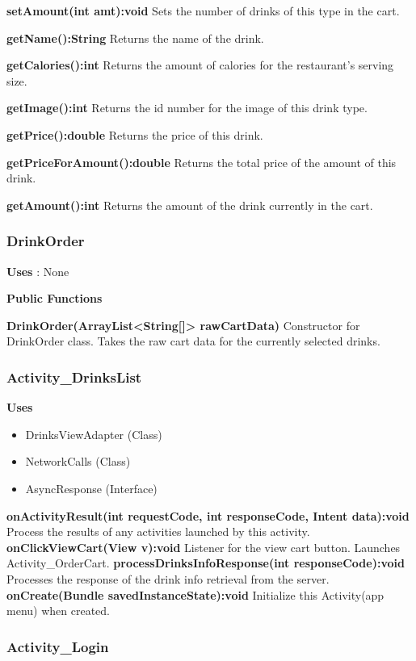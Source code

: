 \documentclass [10pt]{article}
\begin{document}
\textbf{setAmount(int amt):void}
Sets the number of drinks of this type in the cart.

\textbf{getName():String}
Returns the name of the drink.

\textbf{getCalories():int}
Returns the amount of calories for the restaurant’s serving size.

\textbf{getImage():int}
Returns the id number for the image of this drink type.

\textbf{getPrice():double}
Returns the price of this drink.

\textbf{getPriceForAmount():double}
Returns the total price of the amount of this drink.

\textbf{getAmount():int}
Returns the amount of the drink currently in the cart.

\subsubsection{DrinkOrder}

\textbf{Uses} : None

\textbf{Public Functions}

\textbf{DrinkOrder(ArrayList<String[]> rawCartData)}
Constructor for DrinkOrder class. Takes the raw cart data for the currently selected drinks.

\subsubsection{Activity\_DrinksList}

\textbf{Uses}

\begin{itemize}
	\item DrinksViewAdapter (Class)
	\item NetworkCalls (Class)
	\item AsyncResponse (Interface)
\end{itemize}

\textbf{onActivityResult(int requestCode, int responseCode, Intent data):void}
Process the results of any activities launched by this activity.
\textbf{onClickViewCart(View v):void}
Listener for the view cart button. Launches Activity\_OrderCart.
\textbf{processDrinksInfoResponse(int responseCode):void}
Processes the response of the drink info retrieval from the server.
\textbf{onCreate(Bundle savedInstanceState):void}
Initialize this Activity(app menu) when created.

\subsubsection{Activity\_Login}
\end{document}
